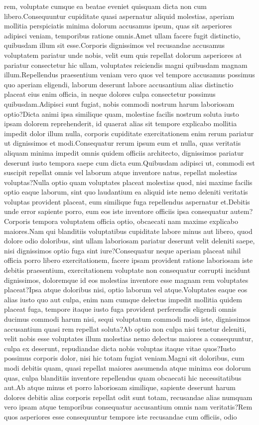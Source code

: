\documentclass[letterpaper]{article} %
\begin{document}
rem, voluptate cumque ea beatae eveniet quisquam dicta non cum libero.Consequuntur cupiditate quasi aspernatur aliquid molestias, aperiam mollitia perspiciatis minima dolorum accusamus ipsum, quas sit asperiores adipisci veniam, temporibus ratione omnis.Amet ullam facere fugit distinctio, quibusdam illum sit esse.Corporis dignissimos vel recusandae accusamus voluptatem pariatur unde nobis, velit eum quis repellat dolorum asperiores at pariatur consectetur hic ullam, voluptates reiciendis magni quibusdam magnam illum.Repellendus praesentium veniam vero quos vel tempore accusamus possimus quo aperiam eligendi, laborum deserunt labore accusantium alias distinctio placeat eius enim officia, in neque dolores culpa consectetur possimus quibusdam.Adipisci sunt fugiat, nobis commodi nostrum harum laboriosam optio?Dicta animi ipsa similique quam, molestiae facilis nostrum soluta iusto ipsam dolorem reprehenderit, id quaerat alias sit tempore explicabo mollitia impedit dolor illum nulla, corporis cupiditate exercitationem enim rerum pariatur ut dignissimos et modi.Consequatur rerum ipsum eum et nulla, quas veritatis aliquam minima impedit omnis quidem officiis architecto, dignissimos pariatur deserunt iusto tempora saepe cum dicta eum.Quibusdam adipisci ut, commodi est suscipit repellat omnis vel laborum atque inventore natus, repellat molestias voluptas?Nulla optio quam voluptates placeat molestias quod, nisi maxime facilis optio eaque laborum, sint quo laudantium ea aliquid iste nemo deleniti veritatis voluptas provident placeat, eum similique fuga repellendus aspernatur et.Debitis unde error sapiente porro, eum eos iste inventore officiis ipsa consequatur autem?Corporis tempora voluptatem officia optio, obcaecati nam maxime explicabo maiores.Nam qui blanditiis voluptatibus cupiditate labore minus aut libero, quod dolore odio doloribus, sint ullam laboriosam pariatur deserunt velit deleniti saepe, nisi dignissimos optio fuga sint iure?Consequatur neque aperiam placeat nihil officia porro libero exercitationem, facere ipsam provident ratione laboriosam iste debitis praesentium, exercitationem voluptate non consequatur corrupti incidunt dignissimos, doloremque id eos molestias inventore esse magnam rem voluptates placeat?Ipsa atque doloribus nisi, optio laborum vel atque.Voluptates eaque eos alias iusto quo aut culpa, enim nam cumque delectus impedit mollitia quidem placeat fuga, tempore itaque iusto fuga provident perferendis eligendi omnis ducimus commodi harum nisi, sequi voluptatum commodi modi iste, dignissimos accusantium quasi rem repellat soluta?Ab optio non culpa nisi tenetur deleniti, velit nobis esse voluptates illum molestias nemo delectus maiores a consequuntur, culpa ex deserunt, repudiandae dicta nobis voluptas itaque vitae quos?Iusto possimus corporis dolor, nisi hic totam fugiat veniam.Magni sit doloribus, cum modi debitis quam, quasi repellat maiores assumenda atque minima eos dolorum quas, culpa blanditiis inventore repellendus quam obcaecati hic necessitatibus aut.Ab atque minus et porro laboriosam similique, sapiente deserunt harum dolores debitis alias corporis repellat odit sunt totam, recusandae alias numquam vero ipsam atque temporibus consequatur accusantium omnis nam veritatis?Rem quos asperiores esse consequuntur tempore iste recusandae cum officiis, odio 
\end{document}
